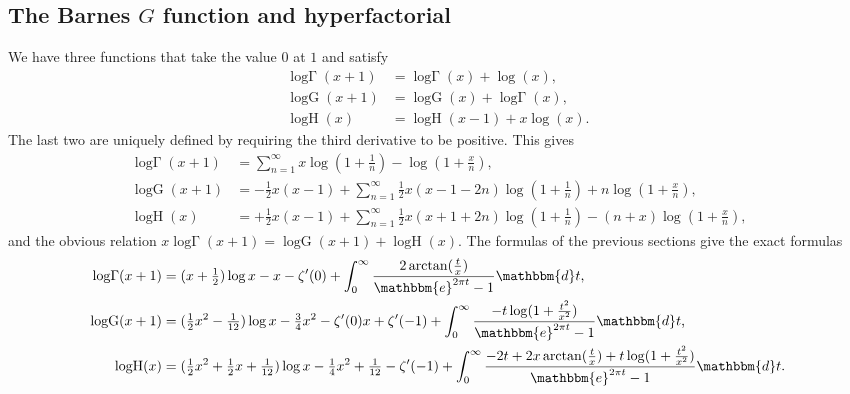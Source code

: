 \documentclass[12pt]{article}
\newcommand{\ee}[0] {\mathbbm{e}}
\newcommand{\dd}[0] {\mathbbm{d}}
\newcommand{\op}[1]  { \operatorname{ #1 }}
\newcommand{\logG} {\operatorname {log \Gamma}}
\numberwithin{equation}{section}
\begin{document}
\subsection{The Barnes $G$ function and hyperfactorial}
We have three functions that take the value $0$ at $1$ and satisfy
\begin{align*}
\logG(x+1) &= \logG(x) + \log (x)\text{,}\\
\op{logG}(x+1) &= \op{logG}(x) + \logG (x)\text{,}\\
\op{logH}(x) &= \op{logH}(x-1) + x \log (x)\text{.}
\end{align*}
The last two are uniquely defined by requiring the third derivative to be positive. This gives
\begin{align*}
\logG(x+1) &= \sum_{n=1}^{\infty} x \log(1+\tfrac{1}{n}) - \log(1+\tfrac{x}{n})\text{,}\\
\op{logG}(x+1) &= -\tfrac{1}{2} x(x-1) + \sum_{n=1}^{\infty} \tfrac{1}{2} x(x-1-2n) \log(1 + \tfrac{1}{n})+n \log(1+\tfrac{x}{n})\text{,}\\
\op{logH}(x) &= +\tfrac{1}{2} x(x-1) + \sum_{n=1}^{\infty} \tfrac{1}{2} x(x+1+2n) \log(1 + \tfrac{1}{n})-(n+x) \log(1+\tfrac{x}{n}) \text{,}
\end{align*}
and the obvious relation $x \logG(x+1) = \op{logG}(x+1) + \op{logH}(x)$.
The formulas of the previous sections give the exact formulas
\begin{align*}
\logG(x+1) &= (x+\tfrac{1}{2}) \log x - x - \zeta'(0) + \int_{0}^{\infty} \frac{2 \arctan( \tfrac{t}{x})}{\ee^{2\pi t}-1} \dd t\text{,}\\
\op{logG}(x+1) &= (\tfrac{1}{2}x^2-\tfrac{1}{12}) \log x - \tfrac{3}{4} x^2 - \zeta'(0) x + \zeta'(-1) + \int_{0}^{\infty} \frac{- t \log(1 + \tfrac{t^2}{x^2})}{\ee^{2\pi t}-1} \dd t\text{,}\\
\op{logH}(x) &= (\tfrac{1}{2}x^2+\tfrac{1}{2}x+\tfrac{1}{12}) \log x - \tfrac{1}{4} x^2 +\tfrac{1}{12} - \zeta'(-1) + \int_{0}^{\infty} \frac{-2t+2x \arctan( \tfrac{t}{x}) + t \log(1 + \tfrac{t^2}{x^2})}{\ee^{2\pi t}-1} \dd t\text{.}
\end{align*}
\end{document}
